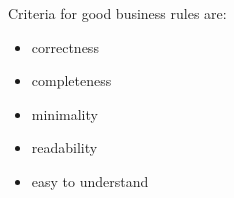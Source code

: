 Criteria for good business rules are:
\begin{itemize}
	\item correctness
	\item completeness
	\item minimality
	\item readability
	\item easy to understand
\end{itemize}
